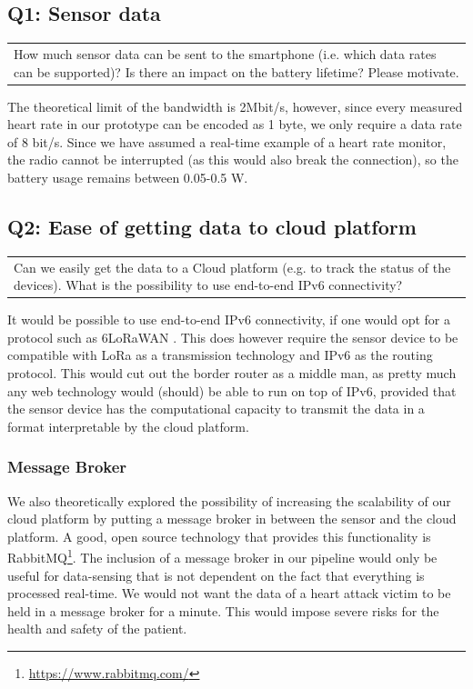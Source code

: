 \documentclass[12pt, a4paper]{article}
\newenvironment{question}
    {\begin{center}
    \begin{tabular}{p{0.9\textwidth}}
    }
    {
    \end{tabular} 
    \end{center}
    }
\newcommand{\ipvsix}{IPv6}
\newcommand{\lora}{LoRa}
\begin{document}
\subsection{Q1: Sensor data}

\begin{question}
How much sensor data can be sent to the smartphone (i.e. which data rates can be supported)? Is there an impact on the battery lifetime? Please motivate.
\end{question}

The theoretical limit of the bandwidth is 2Mbit/s, however, since every measured heart rate in our prototype can be encoded as 1 byte, we only require a data rate of 8 bit/s. Since we have assumed a real-time example of a heart rate monitor, the radio cannot be interrupted (as this would also break the connection), so the battery usage remains between 0.05-0.5 W.

\subsection{Q2: Ease of getting data to cloud platform}

\begin{question}
Can we easily get the data to a Cloud platform (e.g. to track the status of the devices). What is the possibility to use end-to-end \ipvsix{} connectivity?
\end{question}

It would be possible to use end-to-end \ipvsix{} connectivity, if one would opt for a protocol such as 6LoRaWAN \cite{8217061}. This does however require the sensor device to be compatible with \lora{} as a transmission technology and \ipvsix{} as the routing protocol. This would cut out the border router as a middle man, as pretty much any web technology would (should) be able to run on top of \ipvsix{}, provided that the sensor device has the computational capacity to transmit the data in a format interpretable by the cloud platform.

\subsubsection{Message Broker}

We also theoretically explored the possibility of increasing the scalability of our cloud platform by putting a message broker in between the sensor and the cloud platform. A good, open source technology that provides this functionality is RabbitMQ\footnote{\url{https://www.rabbitmq.com/}}. The inclusion of a message broker in our pipeline would only be useful for data-sensing that is not dependent on the fact that everything is processed real-time. We would not want the data of a heart attack victim to be held in a message broker for a minute. This would impose severe risks for the health and safety of the patient.
\end{document}
